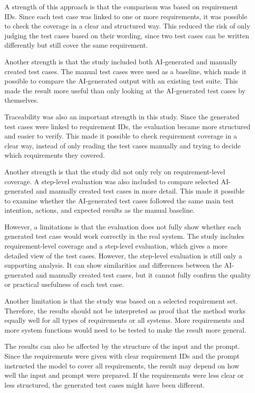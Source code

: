 \documentclass[a4paper,12pt]{article}
\begin{document}
A strength of this approach is that the comparison was based on requirement IDs. Since each test case was linked to one or more requirements, it was possible to check the coverage in a clear and structured way. This reduced the risk of only judging the test cases based on their wording, since two test cases can be written differently but still cover the same requirement.

Another strength is that the study included both AI-generated and manually created test cases. The manual test cases were used as a baseline, which made it possible to compare the AI-generated output with an existing test suite. This made the result more useful than only looking at the AI-generated test cases by themselves.

Traceability was also an important strength in this study. Since the generated test cases were linked to requirement IDs, the evaluation became more structured and easier to verify. This made it possible to check requirement coverage in a clear way, instead of only reading the test cases manually and trying to decide which requirements they covered.

Another strength is that the study did not only rely on requirement-level coverage. A step-level evaluation was also included to compare selected AI-generated and manually created test cases in more detail. This made it possible to examine whether the AI-generated test cases followed the same main test intention, actions, and expected results as the manual baseline.

However, a limitations is that the evaluation does not fully show whether each generated test case would work correctly in the real system. The study includes requirement-level coverage and a step-level evaluation, which gives a more detailed view of the test cases. However, the step-level evaluation is still only a supporting analysis. It can show similarities and differences between the AI-generated and manually created test cases, but it cannot fully confirm the quality or practical usefulness of each test case.

Another limitation is that the study was based on a selected requirement set. Therefore, the results should not be interpreted as proof that the method works equally well for all types of requirements or all systems. More requirements and more system functions would need to be tested to make the result more general.

The results can also be affected by the structure of the input and the prompt. Since the requirements were given with clear requirement IDs and the prompt instructed the model to cover all requirements, the result may depend on how well the input and prompt were prepared. If the requirements were less clear or less structured, the generated test cases might have been different.
\end{document}

